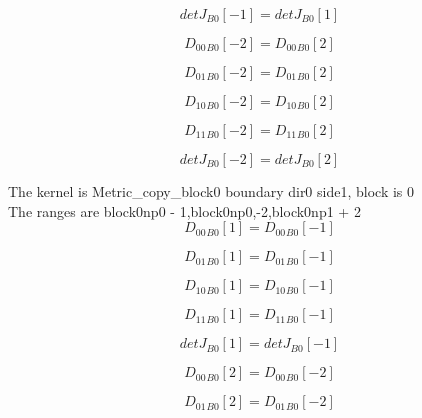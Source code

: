 \documentclass{article}
\begin{document}
\begin{dmath}{detJ{_{B0}}}[{-1}] = {detJ{_{B0}}}[{1}]\end{dmath}

\begin{dmath}{D_{00}{_{B0}}}[{-2}] = {D_{00}{_{B0}}}[{2}]\end{dmath}

\begin{dmath}{D_{01}{_{B0}}}[{-2}] = {D_{01}{_{B0}}}[{2}]\end{dmath}

\begin{dmath}{D_{10}{_{B0}}}[{-2}] = {D_{10}{_{B0}}}[{2}]\end{dmath}

\begin{dmath}{D_{11}{_{B0}}}[{-2}] = {D_{11}{_{B0}}}[{2}]\end{dmath}

\begin{dmath}{detJ{_{B0}}}[{-2}] = {detJ{_{B0}}}[{2}]\end{dmath}

\noindent The kernel is Metric_copy_block0 boundary dir0 side1, block is 0\\\noindent The ranges are block0np0 - 1,block0np0,-2,block0np1 + 2\\\begin{dmath}{D_{00}{_{B0}}}[{1}] = {D_{00}{_{B0}}}[{-1}]\end{dmath}

\begin{dmath}{D_{01}{_{B0}}}[{1}] = {D_{01}{_{B0}}}[{-1}]\end{dmath}

\begin{dmath}{D_{10}{_{B0}}}[{1}] = {D_{10}{_{B0}}}[{-1}]\end{dmath}

\begin{dmath}{D_{11}{_{B0}}}[{1}] = {D_{11}{_{B0}}}[{-1}]\end{dmath}

\begin{dmath}{detJ{_{B0}}}[{1}] = {detJ{_{B0}}}[{-1}]\end{dmath}

\begin{dmath}{D_{00}{_{B0}}}[{2}] = {D_{00}{_{B0}}}[{-2}]\end{dmath}

\begin{dmath}{D_{01}{_{B0}}}[{2}] = {D_{01}{_{B0}}}[{-2}]\end{dmath}
\end{document}
